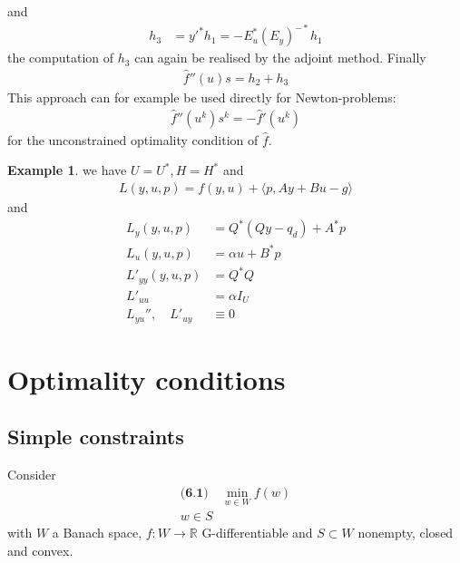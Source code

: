 \documentclass[a4paper,11pt,fleqn]{book}
\theoremstyle{definition}
\newtheorem*{example}{Example}
\theoremstyle{remark}
\begin{document}
and 
\begin{align*}
		h_3 &= y'^* h_1 = -E_u^* (E_y)^{-*} h_1
\end{align*}
the computation of $h_3$ can again be realised by the adjoint method. Finally
\begin{align*}
	\hat{f}''(u)s = h_2 + h_3
\end{align*}
This approach can for example be used directly for Newton-problems:
\begin{align*}
	\hat{f}''(u^k) s^k = - \hat{f}'(u^k)
\end{align*}
for the unconstrained optimality condition of $\hat{f}$. 

\begin{example}
	we have $U = U^*, H = H^*$ and 
	\begin{align*}
		L(y, u, p) = f(y, u) + \langle p, Ay + Bu - g \rangle
	\end{align*}
	and 
	\begin{align*}
		L_y(y, u, p) &= Q^*(Qy - q_d) + A^* p\\
		L_u(y, u, p) &= \alpha u + B^* p\\
		L'_{yy}(y, u, p) &= Q^* Q \\
		L'_{uu} &= \alpha I_U\\
				L_{yu}'' ,\quad L'_{uy} &\equiv 0
	\end{align*}
\end{example}



\section{Optimality conditions}
\subsection{Simple constraints}
Consider 
\begin{align*}\textbf{(6.1)}\quad
	\min_{w \in W} f(w) \\
	w \in S
\end{align*}
with $W$ a Banach space, $f: W \rightarrow \mathbb{R}$ G-differentiable and $S \subset W$ nonempty, closed and convex.
\end{document}
